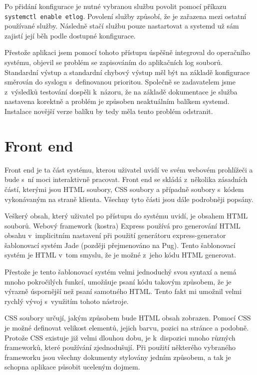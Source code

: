 \documentclass[thesis=M,czech]{FITthesis}[2012/06/26]
\begin{document}
    Po přidání konfigurace je nutné vybranou službu povolit pomocí příkazu \verb|systemctl enable etlog|.
    Povolení služby způsobí, že je zařazena mezi ostatní používané služby.
    Následně stačí službu pouze nastartovat a systemd už sám zajistí její běh podle dostupné konfigurace.

    Přestože aplikaci jsem pomocí tohoto přístupu úspěšně integroval do 
    operačního systému, objevil se problém se zapisováním do aplikačních log souborů.
    Standardní výstup a standardní chybový výstup měl být na základě konfigurace
    směrován do syslogu s~definovanou prioritou.
    Společně se zadavatelem jsme z~výsledků testování dospěli k~názoru, že
    na základě dokumentace je služba nastavena korektně a problém je způsoben neaktuálním balíkem systemd.
    Instalace novější verze balíku by tedy měla tento problém odstranit.

    \section{Front end}

      Front end je ta část systému, kterou uživatel uvidí ve svém webovém prohlížeči
      a bude s~ní moci interaktivně pracovat.
      Front end se skládá z~několika zásadních částí,
      kterými jsou HTML soubory, CSS
      soubory a případně soubory s~kódem vykonávaným na straně klienta.
      Všechny tyto části jsou dále podrobněji popsány.

      Veškerý obsah, který uživatel po přístupu do systému uvidí, je obsahem HTML souborů.
      Webový framework (kostra) Express
      používá pro generování HTML obsahu v~implicitním nastavení při použití generátoru express-generator
      šablonovací systém Jade (později přejmenováno na Pug).
      Tento šablonovací systém je  HTML v~tom smyslu,
      že je možné z~jeho kódu HTML generovat.

      Přestože je tento šablonovací systém velmi jednoduchý
      svou syntaxí a nemá mnoho pokročilých funkcí,
      umožňuje psaní kódu takovým způsobem,
      že je výrazně úspornější než psaní samotného HTML.
      Tento fakt mi umožnil velmi rychlý vývoj s~využitím tohoto nástroje.

      CSS soubory určují, jakým způsobem bude HTML obsah zobrazen.
      Pomocí CSS je možné definovat velikost elementů, jejich barvu, pozici na stránce a podobně.
      Protože CSS existuje již velmi dlouhou dobu,
      je k~dispozici mnoho různých frameworků,
      které používání zjednodušují.
      Při použití některého vybraného frameworku
      jsou všechny dokumenty stylovány jedním způsobem,
      a tak je schopna aplikace působit uceleným dojmem.
\end{document}
